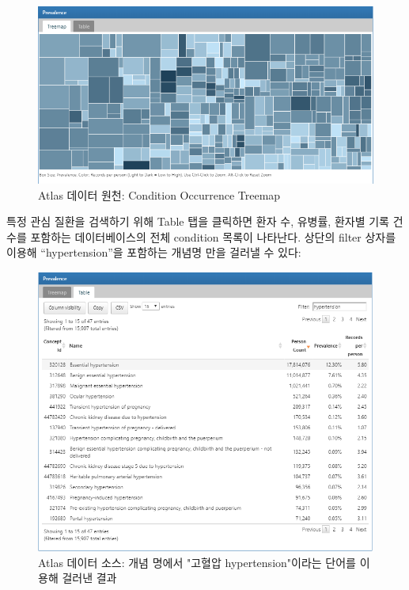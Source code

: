 \documentclass[11pt]{book}
\theoremstyle{definition}
\theoremstyle{definition}
\theoremstyle{definition}
\theoremstyle{remark}
\begin{document}
\begin{figure}

{\centering \includegraphics[width=1\linewidth]{images/Characterization/atlasDataSourcesConditionTreemap} 

}

\caption{Atlas 데이터 원천: Condition Occurrence Treemap}\label{fig:atlasDataSourcesConditionTreemap}
\end{figure}

특정 관심 질환을 검색하기 위해 Table 탭을 클릭하면 환자 수, 유병률,
환자별 기록 건수를 포함하는 데이터베이스의 전체 condition 목록이
나타난다. 상단의 filter 상자를 이용해 ``hypertension''을 포함하는 개념명
만을 걸러낼 수 있다:

\begin{figure}

{\centering \includegraphics[width=1\linewidth]{images/Characterization/atlasDataSourcesConditionFiltered} 

}

\caption{Atlas 데이터 소스: 개념 명에서 "고혈압 hypertension"이라는 단어를 이용해 걸러낸 결과}\label{fig:atlasDataSourcesConditionFiltered}
\end{figure}
\end{document}
